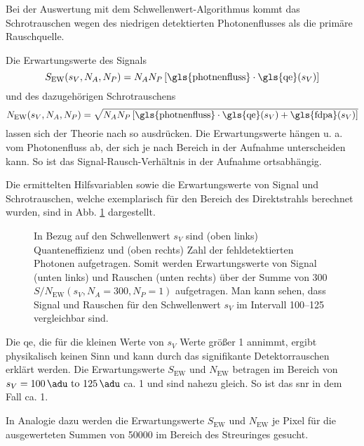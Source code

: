 \noindent
Bei der Auswertung mit dem Schwellenwert-Algorithmus kommt das Schrotrauschen wegen des niedrigen detektierten Photonenflusses als die primäre Rauschquelle.

\noindent
Die Erwartungswerte des Signals 
\begin{equation}
        S_{\text{EW}}(s_V, N_A, N_P) = N_{A}N_{P}\left[\text{\gls{photnenfluss}}\cdot\text{\gls{qe}}(s_V)\right]
        \label{eq:signal_ew}
\end{equation}
und des dazugehörigen Schrotrauschens 
\begin{equation}
        N_{\text{EW}}(s_V, N_A, N_P) = \sqrt{N_{A}N_{P}\left[\text{\gls{photnenfluss}}\cdot\text{\gls{qe}}(s_V) + \text{\gls{fdpa}}(s_V)\right]}
        \label{eq:noise_ew}
\end{equation}
lassen sich der Theorie nach so ausdrücken. Die Erwartungswerte hängen u. a. vom Photonenfluss ab, der sich je nach Bereich in der Aufnahme unterscheiden kann. So ist das Signal-Rausch-Verhältnis in der Aufnahme ortsabhängig.  

\noindent
Die ermittelten Hilfsvariablen sowie die Erwartungswerte von Signal und Schrotrauschen, welche exemplarisch für den Bereich des Direktstrahls berechnet wurden, sind in Abb. \ref{fig:qe_fehldetektiert_signal_noise} dargestellt.
\begin{figure}[H]
    \centering
    
    \caption{In Bezug auf den Schwellenwert $s_V$ sind (oben links) Quanteneffizienz und (oben rechts) Zahl der fehldetektierten Photonen aufgetragen. Somit werden Erwartungswerte von Signal (unten links) und Rauschen (unten rechts) über der Summe von \SI{300}{\captures} $S/N_{\text{EW}}(s_V, N_A = 300, N_P = 1)$ aufgetragen. Man kann sehen, dass Signal und Rauschen für den Schwellenwert $s_V$ im Intervall \qtyrange{100}{125}{\adu} vergleichbar sind.}
    \label{fig:qe_fehldetektiert_signal_noise}
\end{figure}
\noindent
Die \gls{qe}, die für die kleinen Werte von $s_V$ Werte größer \num{1} annimmt, ergibt physikalisch keinen Sinn und kann durch das signifikante Detektorrauschen erklärt werden. Die Erwartungswerte $S_{\text{EW}}$ und $N_{\text{EW}}$ betragen im Bereich von $s_V = \text{\SIrange{100}{125}{\adu}}$ ca. \SI{1}{\photon} und sind nahezu gleich. So ist das \gls{snr} in dem Fall ca. 1.

\noindent
In Analogie dazu werden die Erwartungswerte $S_{\text{EW}}$ und $N_{\text{EW}}$ je Pixel für die ausgewerteten Summen von \SI{50000}{\captures} im Bereich des Streuringes gesucht.

